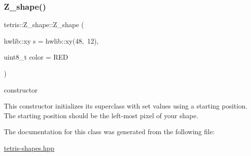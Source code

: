 \subsubsection{\texorpdfstring{Z\+\_\+shape()}{Z\_shape()}}
{\footnotesize\ttfamily tetris\+::\+Z\+\_\+shape\+::\+Z\+\_\+shape (\begin{DoxyParamCaption}\item[{hwlib\+::xy}]{s = {\ttfamily hwlib\+:\+:xy(48,~12)},  }\item[{uint8\+\_\+t}]{color = {\ttfamily RED} }\end{DoxyParamCaption})\hspace{0.3cm}{\ttfamily [inline]}}



constructor 

This constructor initializes its superclass with set values using a starting position. The starting position should be the left-\/most pixel of your shape. 

The documentation for this class was generated from the following file\+:\begin{DoxyCompactItemize}
\item 
\hyperlink{tetris-shapes_8hpp}{tetris-\/shapes.\+hpp}\end{DoxyCompactItemize}
